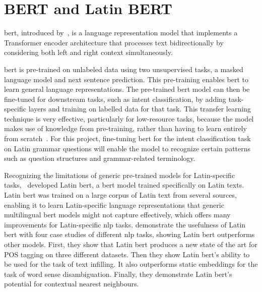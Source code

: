 \section{BERT and Latin BERT}
\label{sec:bert_and_latin_bert}




\gls{bert}, introduced by~\cite{devlin-etal-2019-bert},
is a language representation model that implements
a Transformer encoder architecture that processes text 
bidirectionally by considering both left and right context
simultaneously.

\gls{bert} is pre-trained on unlabeled data using two unsupervised 
tasks, a masked language model and next sentence prediction. 
This pre-training enables \gls{bert} to learn general language 
representations. The pre-trained \gls{bert} model can then be 
fine-tuned for downstream tasks, such as intent classification, 
by adding task-specific layers and training on labelled data 
for that task. This transfer learning technique is very 
effective, particularly for low-resource tasks, because 
the model makes use of knowledge from pre-training, rather 
than having to learn entirely from scratch~\cite{devlin-etal-2019-bert}. 
For this project, fine-tuning \gls{bert} for the intent 
classification task on Latin grammar questions will enable 
the model to recognize certain patterns such as question 
structures and grammar-related terminology.


Recognizing the limitations of generic pre-trained models 
for Latin-specific tasks,~\cite{latinbert} developed 
Latin \gls{bert}, a \gls{bert} model trained specifically on Latin texts. 
Latin \gls{bert} was trained on a large corpus of Latin text 
from several sources, enabling it to learn Latin-specific 
language representations that generic multilingual \gls{bert} 
models might not capture effectively, which offers many 
improvements for Latin-specific \gls{nlp} tasks. 
\cite{latinbert} demonstrate the usefulness of Latin 
\gls{bert} with four case studies of different \gls{nlp} tasks, 
showing Latin \gls{bert} outperforms other models. First, 
they show that Latin \gls{bert} produces a new state of the 
art for POS tagging on three different datasets. Then they 
show Latin \gls{bert}'s ability to be used for the task of text 
infilling. It also outperforms static embeddings for the 
task of word sense disambiguation. Finally, they demonstrate 
Latin \gls{bert}'s potential for contextual nearest neighbours.

